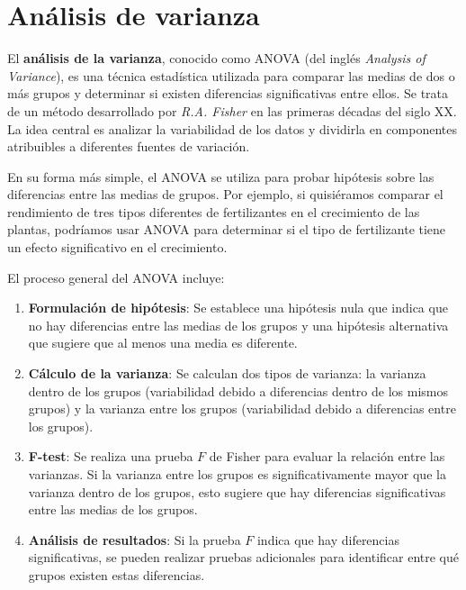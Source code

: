 \documentclass[
  letterpaper,
  DIV=11,
  numbers=noendperiod]{scrreprt}
\begin{document}

\hypertarget{sec-anova}{%
\chapter{Análisis de varianza}\label{sec-anova}}

El \textbf{análisis de la varianza}, conocido como ANOVA (del inglés
\emph{Analysis of Variance}), es una técnica estadística utilizada para
comparar las medias de dos o más grupos y determinar si existen
diferencias significativas entre ellos. Se trata de un método
desarrollado por \emph{R.A. Fisher} en las primeras décadas del siglo
XX. La idea central es analizar la variabilidad de los datos y dividirla
en componentes atribuibles a diferentes fuentes de variación.

En su forma más simple, el ANOVA se utiliza para probar hipótesis sobre
las diferencias entre las medias de grupos. Por ejemplo, si quisiéramos
comparar el rendimiento de tres tipos diferentes de fertilizantes en el
crecimiento de las plantas, podríamos usar ANOVA para determinar si el
tipo de fertilizante tiene un efecto significativo en el crecimiento.

El proceso general del ANOVA incluye:

\begin{enumerate}
\def\labelenumi{\arabic{enumi}.}
\item
  \textbf{Formulación de hipótesis}: Se establece una hipótesis nula que
  indica que no hay diferencias entre las medias de los grupos y una
  hipótesis alternativa que sugiere que al menos una media es diferente.
\item
  \textbf{Cálculo de la varianza}: Se calculan dos tipos de varianza: la
  varianza dentro de los grupos (variabilidad debido a diferencias
  dentro de los mismos grupos) y la varianza entre los grupos
  (variabilidad debido a diferencias entre los grupos).
\item
  \textbf{F-test}: Se realiza una prueba \(F\) de Fisher para evaluar la
  relación entre las varianzas. Si la varianza entre los grupos es
  significativamente mayor que la varianza dentro de los grupos, esto
  sugiere que hay diferencias significativas entre las medias de los
  grupos.
\item
  \textbf{Análisis de resultados}: Si la prueba \(F\) indica que hay
  diferencias significativas, se pueden realizar pruebas adicionales
  para identificar entre qué grupos existen estas diferencias.
\end{enumerate}
\end{document}
